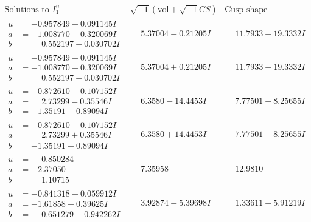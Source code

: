 \documentclass[1p]{elsarticle_modified}
\theoremstyle{definition}
\newcommand{\I}{\sqrt{-1}}
\begin{document}
$$\begin{array}{c|c|c}  
\text{Solutions to }I^u_{1}& \I (\text{vol} + \sqrt{-1}CS) & \text{Cusp shape}\\
 \hline 
\begin{aligned}
u &= -0.957849 + 0.091145 I \\
a &= -1.008770 - 0.320069 I \\
b &= \phantom{-}0.552197 + 0.030702 I\end{aligned}
 & \phantom{-}5.37004 - 0.21205 I & \phantom{-}11.7933 + 19.3332 I \\ \hline\begin{aligned}
u &= -0.957849 - 0.091145 I \\
a &= -1.008770 + 0.320069 I \\
b &= \phantom{-}0.552197 - 0.030702 I\end{aligned}
 & \phantom{-}5.37004 + 0.21205 I & \phantom{-}11.7933 - 19.3332 I \\ \hline\begin{aligned}
u &= -0.872610 + 0.107152 I \\
a &= \phantom{-}2.73299 - 0.35546 I \\
b &= -1.35191 + 0.89094 I\end{aligned}
 & \phantom{-}6.3580 - 14.4453 I & \phantom{-}7.77501 + 8.25655 I \\ \hline\begin{aligned}
u &= -0.872610 - 0.107152 I \\
a &= \phantom{-}2.73299 + 0.35546 I \\
b &= -1.35191 - 0.89094 I\end{aligned}
 & \phantom{-}6.3580 + 14.4453 I & \phantom{-}7.77501 - 8.25655 I \\ \hline\begin{aligned}
u &= \phantom{-}0.850284\phantom{ +0.000000I} \\
a &= -2.37050\phantom{ +0.000000I} \\
b &= \phantom{-}1.10715\phantom{ +0.000000I}\end{aligned}
 & \phantom{-}7.35958\phantom{ +0.000000I} & \phantom{-}12.9810\phantom{ +0.000000I} \\ \hline\begin{aligned}
u &= -0.841318 + 0.059912 I \\
a &= -1.61858 + 0.39625 I \\
b &= \phantom{-}0.651279 - 0.942262 I\end{aligned}
 & \phantom{-}3.92874 - 5.39698 I & \phantom{-}1.33611 + 5.91219 I \\ \hline\begin{aligned}

\end{aligned}
\end{array}$$
\end{document}
